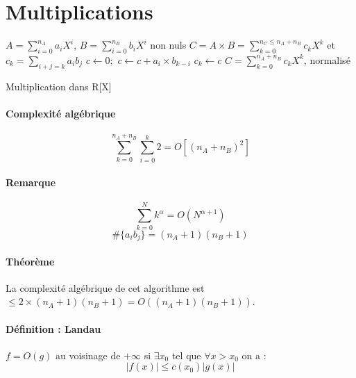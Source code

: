 \documentclass[12pt,a4paper]{report}
\begin{document}
\section{Multiplications}
\begin{algorithm}[h!]
\begin{algorithmic}
\REQUIRE $\displaystyle A=\sum_{i=0}^{n_A} a_i X^i$, $B = \displaystyle \sum_{i=0}^{n_B} b_i X^i$ non nuls
\ENSURE $ \displaystyle C=A\times B = \sum_{k=0}^{n_C\leqslant n_A+n_B} c_k X^k$ et $ \displaystyle c_k=\sum_{i+j=k} a_i b_j$
\STATE $c\leftarrow 0;$
\STATE $c\leftarrow c + a_i\times b_{k-i}$
\STATE $ c_k \leftarrow c $
\ENDFOR
\ENDFOR
\RETURN $C=\displaystyle \sum_{k=0}^{n_A+n_B}c_k X^k $, normalisé
\end{algorithmic}
\caption{Multiplication dans R[X]}
\end{algorithm}
\paragraph{Complexité algébrique\\}
$$\sum_{k=0}^{n_A+n_B} \sum_{i=0}^{k} 2 = O\left[(n_A+n_B)^2\right]$$
\paragraph{Remarque\\}
$$\sum_{k=0}^{N} k^{\alpha} = O(N^{\alpha + 1})$$
$$ \# \{a_ib_j\}=(n_A+1)(n_B+1) $$
\paragraph{Théorème\\}
La complexité algébrique de cet algorithme est $ \leqslant 2\times (n_A+1)(n_B+1) = O\left((n_A+1)(n_B+1)\right) $.
\paragraph{Définition : Landau}
$f=O(g)$  au voisinage de $+\infty$ si $ \exists x_0$ tel que $ \forall x > x_0 $ on a :\\
$$ |f(x)|\leqslant c(x_0)|g(x)| $$
\end{document}
